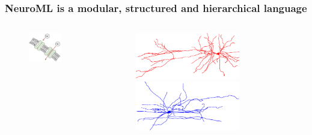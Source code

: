 \begin{frame}[c]
  \frametitle{NeuroML is a modular, structured and hierarchical language}
  \begin{columns}
    \begin{column}{0.3\textwidth}
      \begin{figure}[h]
        \centering
        \includegraphics[width=0.7\textwidth]{99_images/membrane2}
      \end{figure}%
    \end{column}
    \begin{column}{0.3\textwidth}
      \begin{figure}[h]
        \centering
        \includegraphics[width=0.7\textwidth,angle=-90]{99_images/HL23PYR-red}
        \includegraphics[width=0.7\textwidth,angle=-90]{99_images/HL23PV}\\\vspace{0.5cm}

\end{figure}
\end{column}
\end{columns}
\end{frame}
